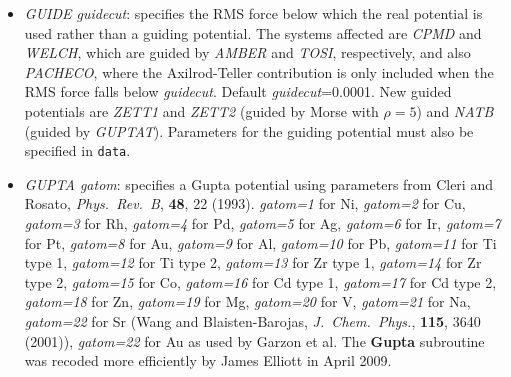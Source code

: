 \documentclass[12pt,a4paper,dvips]{article}
\begin{document}
\begin{itemize}
The {\textrm atomgroups} file is formatted as follows:

{\it GROUP name bondatom1 bondatom2 groupsize rotationscalefactor probselect}

{\it groupatom1}

{\it groupatom2}

{\it groupatom3}

\ldots

The group rotation axis is defined by the vector from {\it bondatom1}->{\it bondatom2}, and the rotation is scaled by {\it rotationscalefactor}
.

Here is an example {\textrm atomgroups} file containing two groups:

{\textrm GROUP OME 6 5 4 1.0 0.8}

{\textrm 1}

{\textrm 2}

{\textrm 3}

{\textrm 4}

{\textrm GROUP CH2OH 23 25 4 1.0 0.8}

{\textrm 26}

{\textrm 27}

{\textrm 28}

{\textrm 29}

\item {\it GUIDE\/ guidecut}: specifies the RMS force below which the real potential is used
rather than a guiding potential. The systems affected are {\it CPMD\/} and {\it WELCH},
which are guided by {\it AMBER\/} and {\it TOSI\/}, respectively, and also {\it PACHECO\/},
where the Axilrod-Teller contribution is only included when the RMS force falls below
{\it guidecut\/}. Default {\it guidecut\/}=0.0001.
New guided potentials are {\it ZETT1} and {\it ZETT2} (guided by Morse with $\rho=5$) and
{\it NATB} (guided by {\it GUPTAT}). Parameters for the guiding potential must also be specified in
{\tt data}.

\item{\it GUPTA gatom}: specifies a Gupta potential using parameters from Cleri and Rosato,
{\it Phys.~Rev.~B}, {\bf 48}, 22 (1993). {\it gatom=1} for Ni, 
{\it gatom=2} for Cu,
{\it gatom=3} for Rh,
{\it gatom=4} for Pd,
{\it gatom=5} for Ag,
{\it gatom=6} for Ir,
{\it gatom=7} for Pt,
{\it gatom=8} for Au,
{\it gatom=9} for Al,
{\it gatom=10} for Pb,
{\it gatom=11} for Ti type 1,
{\it gatom=12} for Ti type 2,
{\it gatom=13} for Zr type 1,
{\it gatom=14} for Zr type 2,
{\it gatom=15} for Co,
{\it gatom=16} for Cd type 1,
{\it gatom=17} for Cd type 2,
{\it gatom=18} for Zn,
{\it gatom=19} for Mg,
{\it gatom=20} for V,
{\it gatom=21} for Na,
{\it gatom=22} for Sr (Wang  and Blaisten-Barojas, {\it J.~Chem.~Phys.}, {\bf 115}, 3640 (2001)),
{\it gatom=22} for Au as used by Garzon et al.
The {\bf Gupta} subroutine was recoded more efficiently by James Elliott in April 2009.


\end{itemize}
\end{document}
